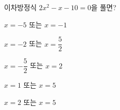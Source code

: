 이차방정식 $2x^2-x-10=0$을 풀면?
\begin{choicesii}{\rule[-3ex]{0pt}{8ex}$x=-5$ 또는 $x=-1$}{\rule[-3ex]{0pt}{8ex}$x=-2$ 또는 $x=\dfrac{5}{2}$}{\rule[-3ex]{0pt}{8ex}$x=-\dfrac{5}{2}$ 또는 $x=2$}{\rule[-3ex]{0pt}{8ex}$x=1$ 또는 $x=5$}{\rule[-3ex]{0pt}{8ex}$x=2$ 또는 $x=5$}\end{choicesii}

